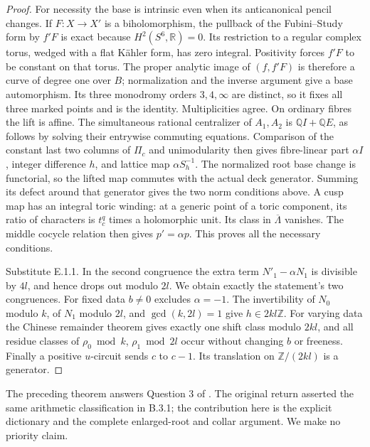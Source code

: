 \begin{proof}
For necessity the base is intrinsic even when its anticanonical
pencil changes.  If $F:X\to X'$ is a biholomorphism, the pullback
of the Fubini--Study form by $f'F$ is exact because
$H^2(S^6,\mathbb R)=0$.  Its restriction to a regular complex torus,
wedged with a flat K\"ahler form, has zero integral.  Positivity
forces $f'F$ to be constant on that torus.  The proper analytic
image of $(f,f'F)$ is therefore a curve of degree one over $B$;
normalization and the inverse argument give a base automorphism.
Its three monodromy orders $3,4,\infty$ are distinct, so it fixes
all three marked points and is the identity.  Multiplicities agree.
On ordinary fibres the lift is affine.  The simultaneous rational
centralizer of $A_1,A_2$ is $\mathbb Q I+\mathbb Q E$, as follows
by solving their entrywise commuting equations.  Comparison of the
constant last two columns of $\Pi_c$ and unimodularity then gives
fibre-linear part $\alpha I$, integer difference $h$, and lattice
map $\alpha S_h^{-1}$.  The normalized root base change is
functorial, so the lifted map commutes with the actual deck
generator.  Summing its defect around that generator gives the
two norm conditions above.  A cusp map has an integral toric
winding: at a generic point of a toric component, its ratio of
characters is $t_c^q$ times a holomorphic unit.  Its class in
$\overline\Lambda$ vanishes.  The middle cocycle relation then
gives $p'=\alpha p$.  This proves all the necessary conditions.

Substitute E.1.1.  In the second congruence the extra term
$N'_1-\alpha N_1$ is divisible by $4l$, and hence drops out
modulo $2l$.  We obtain exactly the statement's two congruences.
For fixed data $b\ne0$ excludes $\alpha=-1$.
The invertibility of $N_0$ modulo $k$, of $N_1$ modulo $2l$, and
$\gcd(k,2l)=1$ give $h\in2kl\mathbb Z$.
For varying data the Chinese remainder theorem gives exactly one
shift class modulo $2kl$, and all residue classes of
$\rho_0\bmod k$, $\rho_1\bmod2l$ occur without changing $b$ or
freeness.  Finally a positive $u$-circuit sends $c$ to $c-1$.
Its translation on $\mathbb Z/(2kl)$ is a generator.
\end{proof}

The preceding theorem answers Question 3 of
\cite[Section 1.1]{ViaLog26push}.  The original return asserted the
same arithmetic classification in B.3.1; the contribution here is
the explicit dictionary and the complete enlarged-root and collar
argument.  We make no priority claim.

